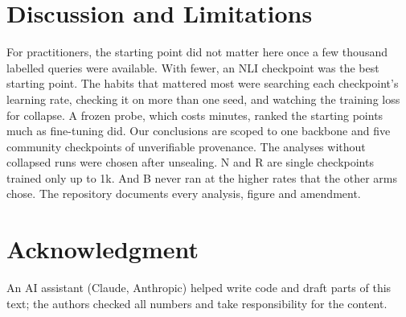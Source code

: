 \documentclass[conference]{IEEEtran}
\begin{document}
\section{Discussion and Limitations}

For practitioners, the starting point did not matter here once a few thousand labelled queries were available. With fewer, an NLI checkpoint was the best starting point. The habits that mattered most were searching each checkpoint's learning rate, checking it on more than one seed, and watching the training loss for collapse. A frozen probe, which costs minutes, ranked the starting points much as fine-tuning did. Our conclusions are scoped to one backbone and five community checkpoints of unverifiable provenance. The analyses without collapsed runs were chosen after unsealing. N and R are single checkpoints trained only up to 1k. And B never ran at the higher rates that the other arms chose. The repository documents every analysis, figure and amendment.

\section*{Acknowledgment}
An AI assistant (Claude, Anthropic) helped write code and draft parts of this text; the authors checked all numbers and take responsibility for the content.



\end{document}
